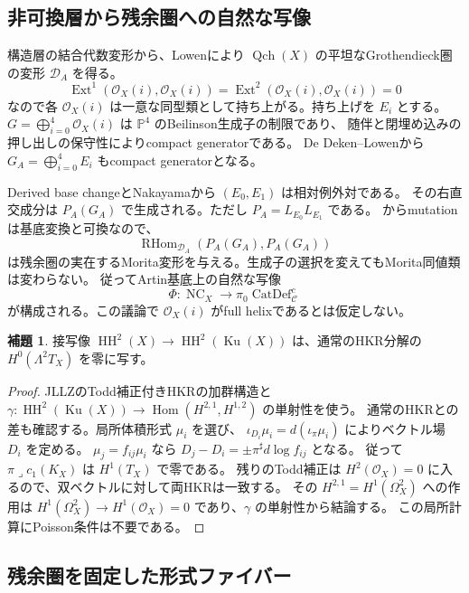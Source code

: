 \documentclass[a4paper,11pt]{ltjsarticle}
\theoremstyle{definition}
\newtheorem{lemma}[theorem]{補題}
\newcommand{\OO}{\mathcal O}
\newcommand{\PP}{\mathbb P}
\newcommand{\Ku}{\operatorname{Ku}}
\newcommand{\HH}{\operatorname{HH}}
\newcommand{\Ext}{\operatorname{Ext}}
\newcommand{\NC}{\operatorname{NC}}
\newcommand{\RHom}{\operatorname{RHom}}
\newcommand{\CatDef}{\operatorname{CatDef}}
\begin{document}
\subsection{非可換層から残余圏への自然な写像}

構造層の結合代数変形から、Lowen\cite[Theorem 3.26]{LowenPre}により
$\operatorname{Qch}(X)$ の平坦なGrothendieck圏の変形 $\mathcal D_A$ を得る。
\[
 \Ext^1(\OO_X(i),\OO_X(i))=
 \Ext^2(\OO_X(i),\OO_X(i))=0
\]
なので各 $\OO_X(i)$ は一意な同型類として持ち上がる。持ち上げを $E_i$ とする。
$G=\bigoplus_{i=0}^4\OO_X(i)$ は $\PP^4$ のBeilinson生成子の制限であり、
随伴と閉埋め込みの押し出しの保守性によりcompact generatorである。
De Deken--Lowen\cite[Propositions 5.8--5.10]{DDL}から
$G_A=\bigoplus_{i=0}^4E_i$ もcompact generatorとなる。

Derived base changeとNakayamaから $(E_0,E_1)$ は相対例外対である。
その右直交成分は $P_A(G_A)$ で生成される。ただし
$P_A=L_{E_0}L_{E_1}$ である。
\cite[Lemma 5.14]{DDL}からmutationは基底変換と可換なので、
\[
 \RHom_{\mathcal D_A}(P_A(G_A),P_A(G_A))
\]
は残余圏の実在するMorita変形を与える。生成子の選択を変えてもMorita同値類は変わらない。
従ってArtin基底上の自然な写像
\[
 \Phi:\NC_X\longrightarrow\pi_0\CatDef^c_{\mathcal C}
\]
が構成される。この議論で $\OO_X(i)$ がfull helixであるとは仮定しない。

\begin{lemma}\label{lem:bivector-zero}
接写像 $\HH^2(X)\to\HH^2(\Ku(X))$ は、通常のHKR分解の
$H^0(\Lambda^2T_X)$ を零に写す。
\end{lemma}
\begin{proof}
JLLZ\cite[Theorems 3.10, 4.4(2)]{JLLZ}のTodd補正付きHKRの加群構造と
$\gamma:\HH^2(\Ku(X))\to\operatorname{Hom}(H^{2,1},H^{1,2})$ の単射性を使う。
通常のHKRとの差も確認する。局所体積形式 $\mu_i$ を選び、
$\iota_{D_i}\mu_i=d(\iota_\pi\mu_i)$ によりベクトル場 $D_i$ を定める。
$\mu_j=f_{ij}\mu_i$ なら $D_j-D_i=\pm\pi^\sharp d\log f_{ij}$ となる。
従って $\pi\lrcorner c_1(K_X)$ は $H^1(T_X)$ で零である。
残りのTodd補正は $H^2(\OO_X)=0$ に入るので、双ベクトルに対して両HKRは一致する。
その $H^{2,1}=H^1(\Omega_X^2)$ への作用は
$H^1(\Omega_X^2)\to H^1(\OO_X)=0$ であり、$\gamma$ の単射性から結論する。
この局所計算にPoisson条件は不要である。
\end{proof}

\subsection{残余圏を固定した形式ファイバー}
\end{document}
